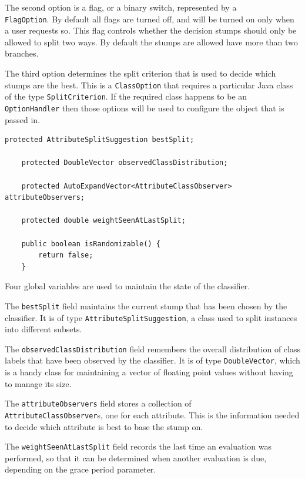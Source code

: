 \documentclass[a4paper,12pt,twoside]{book}
\begin{document}
The second option is a flag, or a binary switch, represented by a \\ \verb+FlagOption+. By default all flags are turned off, and will be turned on only when a user requests so. This flag controls whether the decision stumps should only be allowed to split two ways. By default the stumps are allowed have more than two branches.

The third option determines the split criterion that is used to decide which stumps are the best. This is a \verb+ClassOption+ that requires a particular Java class of the type \verb+SplitCriterion+. If the required class happens to be an \verb+OptionHandler+ then those options will be used to configure the object that is passed in.

\begin{lstlisting}[caption={Miscellaneous fields},label=lst:miscfields,firstnumber=25]
	protected AttributeSplitSuggestion bestSplit;

	protected DoubleVector observedClassDistribution;

	protected AutoExpandVector<AttributeClassObserver> attributeObservers;

	protected double weightSeenAtLastSplit;

	public boolean isRandomizable() {
		return false;
	}
\end{lstlisting}

Four global variables are used to maintain the state of the classifier.

The \verb+bestSplit+ field maintains the current stump that has been chosen by the classifier. It is of type \verb+AttributeSplitSuggestion+, a class used to split instances into different subsets.

The \verb+observedClassDistribution+ field remembers the overall distribution of class labels that have been observed by the classifier. It is of type \verb+DoubleVector+, which is a handy class for maintaining a vector of floating point values without having to manage its size.

The \verb+attributeObservers+ field stores a collection of \\ \verb+AttributeClassObserver+s, one for each attribute. This is the information needed to decide which attribute is best to base the stump on.

The \verb+weightSeenAtLastSplit+ field records the last time an evaluation was performed, so that it can be determined when another evaluation is due, depending on the grace period parameter.
\end{document}
